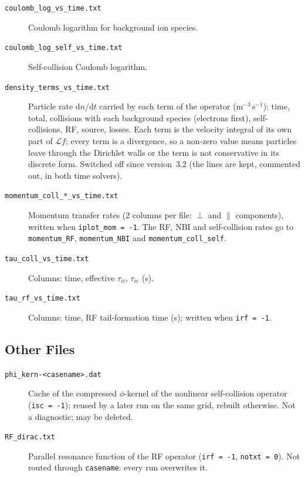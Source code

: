 \documentclass[11pt,a4paper]{article}
\begin{document}
\begin{description}
  \item[\texttt{coulomb\_log\_vs\_time.txt}] Coulomb logarithm for background ion species.
  \item[\texttt{coulomb\_log\_self\_vs\_time.txt}] Self-collision Coulomb logarithm.
  \item[\texttt{density\_terms\_vs\_time.txt}] Particle rate $\mathrm{d}n/\mathrm{d}t$
        carried by each term of the operator (m$^{-3}$\,s$^{-1}$): time, total,
        collisions with each background species (electrons first),
        self-collisions, RF, source, losses.  Each term is the velocity
        integral of its own part of $\mathcal{L}f$; every term is a divergence,
        so a non-zero value means particles leave through the Dirichlet walls
        or the term is not conservative in its discrete form.  Switched off
        since version~3.2 (the lines are kept, commented out, in both time
        solvers).
  \item[\texttt{momentum\_coll\_*\_vs\_time.txt}] Momentum transfer rates
        (2 columns per file: $\perp$ and $\parallel$ components), written when
        \texttt{iplot\_mom = -1}.  The RF, NBI and self-collision rates go
        to \texttt{momentum\_RF}, \texttt{momentum\_NBI} and
        \texttt{momentum\_coll\_self}.
  \item[\texttt{tau\_coll\_vs\_time.txt}] Columns: time, effective
        $\tau_{ii}$, $\tau_{ie}$ (s).
  \item[\texttt{tau\_rf\_vs\_time.txt}] Columns: time, RF tail-formation
        time (s); written when \texttt{irf = -1}.
\end{description}

\subsection{Other Files}

\begin{description}
  \item[\texttt{phi\_kern-<casename>.dat}] Cache of the compressed
        $\phi$-kernel of the nonlinear self-collision operator
        (\texttt{isc = -1}); reused by a later run on the same grid, rebuilt
        otherwise.  Not a diagnostic; may be deleted.
  \item[\texttt{RF\_dirac.txt}] Parallel resonance function of the RF
        operator (\texttt{irf = -1}, \texttt{notxt = 0}).  Not routed through
        \texttt{casename}: every run overwrites it.
\end{description}
\end{document}
